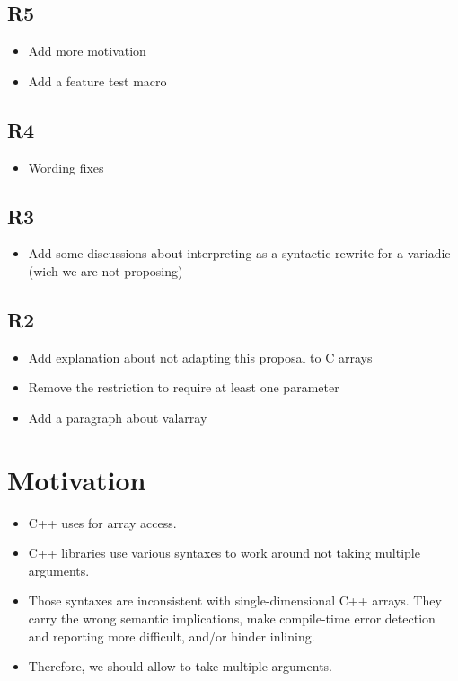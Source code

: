 \documentclass{wg21}
\begin{document}
\subsection{R5}

\begin{itemize}
\item Add more motivation
\item Add a feature test macro
\end{itemize}

\subsection{R4}

\begin{itemize}
\item Wording fixes
\end{itemize}


\subsection{R3}

\begin{itemize}
\item Add some discussions about interpreting  as a syntactic rewrite for a variadic  (wich we are not proposing)
\end{itemize}


\subsection{R2}

\begin{itemize}
    \item Add explanation about not adapting this proposal to C arrays
    \item Remove the restriction to require at least one parameter
    \item Add a paragraph about valarray
\end{itemize}

\section{Motivation}

\begin{itemize}
\item C++ uses  for array access.
\item C++ libraries use various syntaxes to work around  not taking multiple arguments.
\item Those syntaxes are inconsistent with single-dimensional C++ arrays.
  They carry the wrong semantic implications,
  make compile-time error detection and reporting more difficult,
  and/or hinder inlining.
\item Therefore, we should allow  to take multiple arguments.
\end{itemize}
\end{document}

